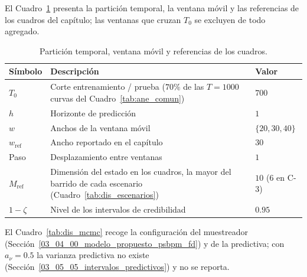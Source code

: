 El Cuadro~\ref{tab:dis_particion} presenta la partición temporal, la ventana móvil y las referencias de los cuadros del capítulo; las ventanas que cruzan $T_0$ se excluyen de todo agregado.

\begin{table}[H]
\centering\small
\caption{Partición temporal, ventana móvil y referencias de los cuadros.}
\label{tab:dis_particion}
\begin{tabular}{p{} p{} p{}}
\hline
Símbolo & Descripción & Valor \\
\hline
$T_0$              & Corte entrenamiento / prueba ($70\%$ de las $T = 1000$ curvas del Cuadro~\ref{tab:ane_comun}) & $700$ \\
$h$                & Horizonte de predicción                         & $1$ \\
$w$                & Anchos de la ventana móvil                      & $\{20, 30, 40\}$ \\
$w_{\mathrm{ref}}$ & Ancho reportado en el capítulo                  & $30$ \\
Paso               & Desplazamiento entre ventanas                   & $1$ \\
$M_{\mathrm{ref}}$ & Dimensión del estado en los cuadros, la mayor del barrido de cada escenario (Cuadro~\ref{tab:dis_escenarios}) & $10$ ($6$ en C-3) \\
$1-\zeta$          & Nivel de los intervalos de credibilidad         & $0.95$ \\
\hline
\end{tabular}
\end{table}

El Cuadro~\ref{tab:dis_mcmc} recoge la configuración del muestreador (Sección~\ref{03_04_00_modelo_propuesto_psbpm_fd}) y de la predictiva; con $a_\nu = 0.5$ la varianza predictiva no existe (Sección~\ref{03_05_05_intervalos_predictivos}) y no se reporta.

